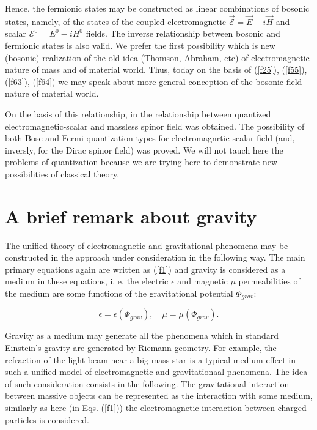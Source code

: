 \documentclass[a4paper,12pt]{article}
\begin{document}
Hence, the fermionic states may be constructed as linear combinations of
bosonic states, namely, of the states of the coupled electromagnetic $%
\overrightarrow{\mathcal{E}}=\overrightarrow{E}-i\overrightarrow{H}$ and
scalar $\mathcal{E}^0=E^0-iH^0$ fields. The inverse relationship between
bosonic and fermionic states is also valid. We prefer the first possibility
which is new (bosonic) realization of the old idea (Thomson, Abraham, etc)
of electromagnetic nature of mass and of material world. Thus, today on the
basis of (\ref{f25}), (\ref{f55}), (\ref{f63}), (\ref{f64}) we may speak
about more general conception of the bosonic field nature of material world.

On the basis of this relationship, in \cite{S2} the relationship between
quantized electromagnetic-scalar and massless spinor field was obtained. The
possibility of both Bose and Fermi quantization types for
electromagnrtic-scalar field (and, inversly, for the Dirac spinor field) was
proved. We will not tauch here the problems of quantization because we are
trying here to demonstrate new possibilities of classical theory.

\section{A brief remark about gravity}

The unified theory of electromagnetic and gravitational phenomena may be
constructed in the approach under consideration in the following way. The
main primary equations again are written as (\ref{f1}) and gravity is
considered as a medium in these equations, i. e. the electric $\epsilon $
and magnetic $\mu $ permeabilities of the medium are some functions of the
gravitational potential $\Phi _{grav}$:

\begin{equation}
\epsilon =\epsilon (\Phi _{grav}),\quad \mu =\mu (\Phi _{grav}).  \label{f65}
\end{equation}

Gravity as a medium may generate all the phenomena which in standard
Einstein's gravity are generated by Riemann geometry. For example, the
refraction of the light beam near a big mass star is a typical medium effect
in such a unified model of electromagnetic and gravitationaal phenomena. The
idea of such consideration consists in the following. The gravitational
interaction between massive objects can be represented as the interaction
with some medium, similarly as here (in Eqs. (\ref{f1})) the electromagnetic
interaction between charged particles is considered.
\end{document}
